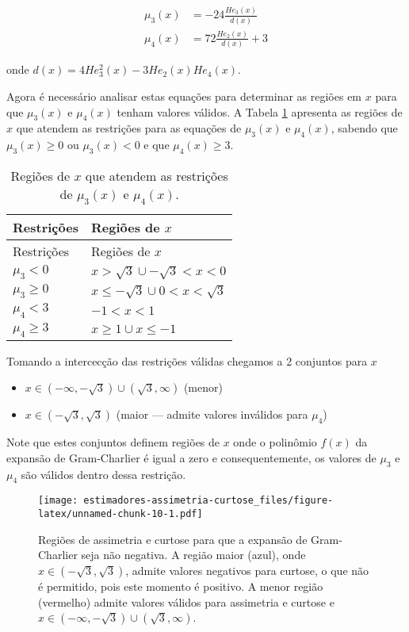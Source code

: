 \documentclass[]{article}
\providecommand{\tightlist}{%
  \setlength{\itemsep}{0pt}\setlength{\parskip}{0pt}}
\begin{document}
\[
\begin{split}
\mu_3(x) &= -24\frac{He_3(x)}{d(x)} \\
\mu_4(x) &= 72\frac{He_2(x)}{d(x)} + 3
\end{split}
\]

onde \(d(x) = 4He_3^2(x) - 3He_2(x) He_4(x)\).

Agora é necessário analisar estas equações para determinar as regiões em
\(x\) para que \(\mu_3(x)\) e \(\mu_4(x)\) tenham valores válidos. A
Tabela \ref{tab:1} apresenta as regiões de \(x\) que atendem as
restrições para as equações de \(\mu_3(x)\) e \(\mu_4(x)\), sabendo que
\(\mu_3(x) \geq 0\) ou \(\mu_3(x) < 0\) e que \(\mu_4(x) \geq 3\).

\begin{longtable}[]{@{}ll@{}}
\caption{\label{tab:1} Regiões de \(x\) que atendem as restrições de
\(\mu_3(x)\) e \(\mu_4(x)\).}\tabularnewline
\toprule
Restrições & Regiões de \(x\)\tabularnewline
\midrule
\endfirsthead
\toprule
Restrições & Regiões de \(x\)\tabularnewline
\midrule
\endhead
\(\mu_3 < 0\) & \(x > \sqrt{3} \cup -\sqrt{3} < x < 0\)\tabularnewline
\(\mu_3 \geq 0\) &
\(x \leq -\sqrt{3} \cup 0 < x < \sqrt{3}\)\tabularnewline
\(\mu_4 < 3\) & \(-1 < x < 1\)\tabularnewline
\(\mu_4 \geq 3\) & \(x \geq 1 \cup x \leq -1\)\tabularnewline
\bottomrule
\end{longtable}

Tomando a intercecção das restrições válidas chegamos a 2 conjuntos para
\(x\)

\begin{itemize}
\tightlist
\item
  \(x \in (-\infty, -\sqrt{3}) \cup (\sqrt{3}, \infty)\) (menor)
\item
  \(x \in (-\sqrt{3}, \sqrt{3})\) (maior --- admite valores inválidos
  para \(\mu_4\))
\end{itemize}

Note que estes conjuntos definem regiões de \(x\) onde o polinômio
\(f(x)\) da expansão de Gram-Charlier é igual a zero e consequentemente,
os valores de \(\mu_3\) e \(\mu_4\) são válidos dentro dessa restrição.

\begin{figure}
\centering
\texttt{[image: estimadores-assimetria-curtose\_files/figure-latex/unnamed-chunk-10-1.pdf]}
\caption{\label{fig:eggs} Regiões de assimetria e curtose para que a
expansão de Gram-Charlier seja não negativa. A região maior (azul), onde
\(x \in (-\sqrt{3}, \sqrt{3})\), admite valores negativos para curtose,
o que não é permitido, pois este momento é positivo. A menor região
(vermelho) admite valores válidos para assimetria e curtose e
\(x \in (-\infty, -\sqrt{3}) \cup (\sqrt{3}, \infty)\).}
\end{figure}
\end{document}
